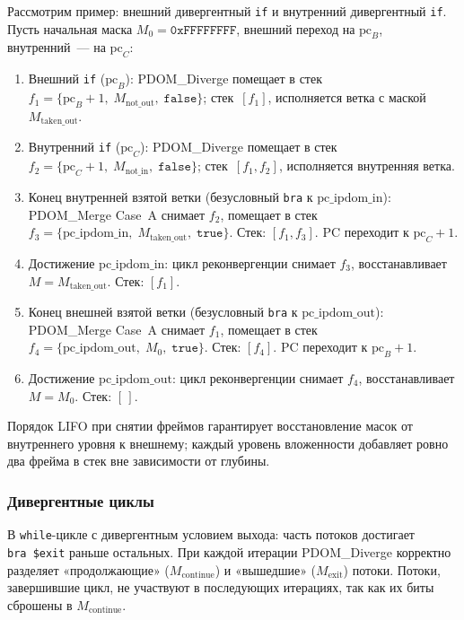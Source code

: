 Рассмотрим пример: внешний дивергентный \texttt{if} и внутренний
дивергентный \texttt{if}. Пусть начальная маска $M_0 = \texttt{0xFFFFFFFF}$,
внешний переход на $\mathrm{pc}_B$, внутренний~--- на $\mathrm{pc}_C$:

\begin{enumerate}
  \item Внешний \texttt{if} ($\mathrm{pc}_B$): PDOM\_Diverge помещает в стек
        $f_1 = \{\mathrm{pc}_B{+}1,\; M_{\mathrm{not\_out}},\;\texttt{false}\}$;
        стек~$[f_1]$, исполняется ветка с маской $M_{\mathrm{taken\_out}}$.
  \item Внутренний \texttt{if} ($\mathrm{pc}_C$): PDOM\_Diverge помещает в стек
        $f_2 = \{\mathrm{pc}_C{+}1,\; M_{\mathrm{not\_in}},\;\texttt{false}\}$;
        стек~$[f_1, f_2]$, исполняется внутренняя ветка.
  \item Конец внутренней взятой ветки (безусловный \texttt{bra} к $\mathrm{pc\_ipdom\_in}$):
        PDOM\_Merge Case~A снимает $f_2$, помещает в стек
        $f_3 = \{\mathrm{pc\_ipdom\_in},\; M_{\mathrm{taken\_out}},\;\texttt{true}\}$.
        Стек: $[f_1, f_3]$. PC переходит к $\mathrm{pc}_C{+}1$.
  \item Достижение $\mathrm{pc\_ipdom\_in}$: цикл реконвергенции снимает
        $f_3$, восстанавливает $M = M_{\mathrm{taken\_out}}$.
        Стек: $[f_1]$.
  \item Конец внешней взятой ветки (безусловный \texttt{bra} к $\mathrm{pc\_ipdom\_out}$):
        PDOM\_Merge Case~A снимает $f_1$, помещает в стек
        $f_4 = \{\mathrm{pc\_ipdom\_out},\; M_0,\;\texttt{true}\}$.
        Стек: $[f_4]$. PC переходит к $\mathrm{pc}_B{+}1$.
  \item Достижение $\mathrm{pc\_ipdom\_out}$: цикл реконвергенции снимает
        $f_4$, восстанавливает $M = M_0$.
        Стек: $[\,]$.
\end{enumerate}

Порядок LIFO при снятии фреймов гарантирует восстановление масок от внутреннего уровня к внешнему; каждый уровень вложенности добавляет ровно два фрейма в стек вне зависимости от глубины.

\subsubsection{Дивергентные циклы}

В \texttt{while}-цикле с дивергентным условием выхода: часть потоков
достигает \texttt{bra~\$exit} раньше остальных. При каждой итерации
PDOM\_Diverge корректно разделяет «продолжающие» ($M_{\mathrm{continue}}$)
и «вышедшие» ($M_{\mathrm{exit}}$) потоки. Потоки, завершившие цикл,
не участвуют в последующих итерациях, так как их биты сброшены
в $M_{\mathrm{continue}}$.


